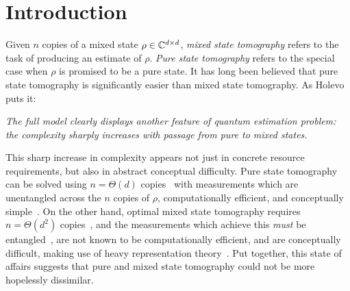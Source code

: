 \documentclass{article}
\begin{document}
\section{Introduction}
Given $n$ copies of a mixed state $\rho \in \mathbb C^{d \times d}$, \emph{mixed state tomography} refers to the task of producing an estimate of $\rho$.
\emph{Pure state tomography} refers to the special case when $\rho$ is promised to be a pure state.
It has long been believed that pure state tomography is significantly easier than mixed state tomography.
As Holevo~\cite[Section 4.11]{Hol11} puts it:
\begin{center}
\textit{The full model clearly displays another feature of quantum estimation problem:\\the complexity sharply increases with passage from pure to mixed states.}
\end{center}
This sharp increase in complexity appears not just in concrete resource requirements, but also in abstract conceptual difficulty.
Pure state tomography can be solved using $n = \Theta(d)$ copies~\cite{Hay98,SSW25} with measurements which are  unentangled across the $n$ copies of $\rho$,  computationally efficient, and conceptually simple~\cite{KRT14,GKKT20}.
On the other hand, optimal mixed state tomography requires $n = \Theta(d^2)$ copies~\cite{HHJ+16,OW16}, and the measurements which achieve this \emph{must} be entangled~\cite{CHL+23,CLL24a}, are not known to be computationally efficient, and are conceptually difficult, making use of heavy representation theory~\cite{HHJ+16,OW16,PSW25}.
Put together, this state of affairs suggests that pure and mixed state tomography could not be more hopelessly dissimilar.
\end{document}
